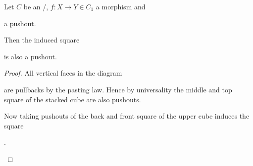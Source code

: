 \begin{lemma}\label{lem:pushoutProdSquareIsPushout}
    Let $C$ be an \inftytop/, $f\colon X\to Y\in C_1$ a morphism and 
    \begin{center}
    \end{center} 
    a pushout.

    Then the induced square 
    \begin{center}
    \end{center} 
    is also a pushout.
    \begin{proof}
        All vertical faces in the diagram
        \begin{center}
        \end{center}
        are pullbacks by the pasting law.
        Hence by universality the middle and top square of the stacked cube are also pushouts.

        Now taking pushouts of the back and front square of the upper cube induces the square 
        \begin{center}
            \;.
        \end{center} 


\end{proof}
\end{lemma}
